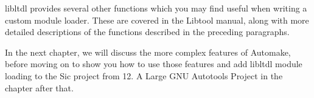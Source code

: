 libltdl provides several other functions which you may find useful when writing a custom module loader. These are covered in the Libtool manual, along with more detailed descriptions of the functions described in the preceding paragraphs.

In the next chapter, we will discuss the more complex features of Automake, before moving on to show you how to use those features and add libltdl module loading to the Sic project from 12. A Large GNU Autotools Project in the chapter after that. 



